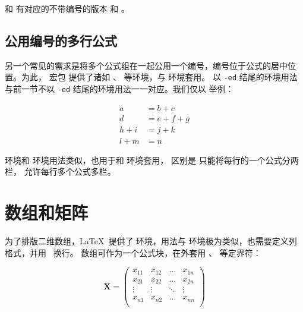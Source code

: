  和  有对应的不带编号的版本  和 。

\subsection{公用编号的多行公式}\label{subsec:aligned}

另一个常见的需求是将多个公式组在一起公用一个编号，编号位于公式的居中位置。为此， 宏包
提供了诸如 、 等环境，与  环境套用。
以 \texttt{-ed} 结尾的环境用法与前一节不以 \texttt{-ed} 结尾的环境用法一一对应。我们仅以  举例：
\begin{example}
\begin{equation}
\begin{aligned}
a &= b + c \\
d &= e + f + g \\
h + i &= j + k \\
l + m &= n
\end{aligned}
\end{equation}
\end{example}

 环境和  环境用法类似，也用于和  环境套用，
区别是  只能将每行的一个公式分两栏， 允许每行多个公式多栏。


\section{数组和矩阵}\label{sec:arrays}

为了排版二维数组，\LaTeX\ 提供了  环境，用法与  环境极为类似，也需要定义列格式，并用 \crcmd\ 换行。
数组可作为一个公式块，在外套用 、 等定界符：
\begin{example}
\[ \mathbf{X} = \left(
\begin{array}{cccc}
x_{11} & x_{12} & \ldots & x_{1n}\\
x_{21} & x_{22} & \ldots & x_{2n}\\
\vdots & \vdots & \ddots & \vdots\\
x_{n1} & x_{n2} & \ldots & x_{nn}\\
\end{array} \right) \]
\end{example}

